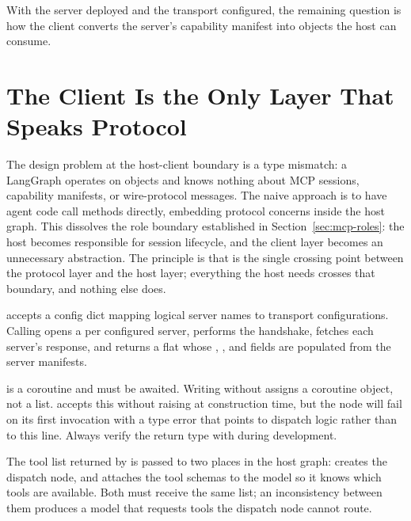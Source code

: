 With the server deployed and the transport configured, the remaining
question is how the client converts the server's capability manifest
into objects the host can consume.

\section{The Client Is the Only Layer That Speaks Protocol}
\label{sec:mcp-toolkit}

The design problem at the host-client boundary is a type mismatch:
a LangGraph  operates on  objects and
knows nothing about MCP sessions, capability manifests, or wire-protocol
messages. The naive approach is to have agent code call
 methods directly, embedding protocol concerns
inside the host graph. This dissolves the role boundary established in
Section~\ref{sec:mcp-roles}: the host becomes responsible for session
lifecycle, and the client layer becomes an unnecessary abstraction.
The principle is that  is the
single crossing point between the protocol layer and the host layer;
everything the host needs crosses that boundary, and nothing else does.

 accepts a config dict mapping logical server
names to transport configurations. Calling
 opens a  per
configured server, performs the  handshake, fetches
each server's  response, and returns a flat
 whose , , and
 fields are populated from the server manifests.

\begin{warningbox}
 is a coroutine and must be awaited.
Writing  without 
assigns a coroutine object, not a list.
 accepts this without raising at construction
time, but the node will fail on its first invocation with a type error
that points to dispatch logic rather than to this line.
Always verify the return type with 
during development.
\end{warningbox}

The tool list returned by  is passed to two places
in the host graph:  creates the dispatch node,
and  attaches the tool schemas to the
model so it knows which tools are available. Both must receive the
same list; an inconsistency between them produces a model that requests
tools the dispatch node cannot route.


